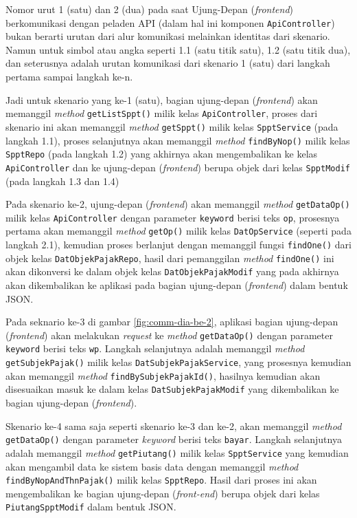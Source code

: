 \documentclass[pdftex,12pt, oneside]{article}
\begin{document}
Nomor urut 1 (satu) dan 2 (dua) pada saat Ujung-Depan (\textit{frontend}) berkomunikasi dengan peladen API (dalam hal ini komponen \texttt{ApiController}) bukan berarti urutan dari alur komunikasi melainkan identitas dari skenario. Namun untuk simbol atau angka seperti 1.1 (satu titik satu), 1.2 (satu titik dua), dan seterusnya adalah urutan komunikasi dari skenario 1 (satu) dari langkah pertama sampai langkah ke-n.

Jadi untuk skenario yang ke-1 (satu), bagian ujung-depan (\textit{frontend}) akan memanggil \textit{method} \texttt{getListSppt()} milik kelas \texttt{ApiController}, proses dari skenario ini akan memanggil \textit{method} \texttt{getSppt()} milik kelas \texttt{SpptService} (pada langkah 1.1), proses selanjutnya akan memanggil \textit{method} \texttt{findByNop()} milik kelas \texttt{SpptRepo} (pada langkah 1.2) yang akhirnya akan mengembalikan ke kelas \texttt{ApiController} dan ke ujung-depan (\textit{frontend}) berupa objek dari kelas \texttt{SpptModif} (pada langkah 1.3 dan 1.4)

Pada skenario ke-2, ujung-depan (\textit{frontend}) akan memanggil \textit{method} \texttt{getDataOp()} milik kelas \texttt{ApiController} dengan parameter \texttt{keyword} berisi teks \texttt{op}, prosesnya pertama akan memanggil \textit{method} \texttt{getOp()} milik kelas \texttt{DatOpService} (seperti pada langkah 2.1), kemudian proses berlanjut dengan memanggil fungsi \texttt{findOne()} dari objek kelas \texttt{DatObjekPajakRepo}, hasil dari pemanggilan \textit{method} \texttt{findOne()} ini akan dikonversi ke dalam objek kelas \texttt{DatObjekPajakModif} yang pada akhirnya akan dikembalikan ke aplikasi pada bagian ujung-depan (\textit{frontend}) dalam bentuk JSON.

Pada seknario ke-3 di gambar \ref{fig:comm-dia-be-2}, aplikasi bagian ujung-depan (\textit{frontend}) akan melakukan \textit{request} ke \textit{method} \texttt{getDataOp()} dengan parameter \texttt{keyword} berisi teks \texttt{wp}. Langkah selanjutnya adalah memanggil \textit{method} \texttt{getSubjekPajak()} milik kelas \texttt{DatSubjekPajakService}, yang prosesnya kemudian akan memanggil \textit{method} \texttt{findBySubjekPajakId()}, hasilnya kemudian akan disesuaikan masuk ke dalam kelas \texttt{DatSubjekPajakModif} yang dikembalikan ke bagian ujung-depan (\textit{frontend}).

Skenario ke-4 sama saja seperti skenario ke-3 dan ke-2, akan memanggil \textit{method} \texttt{getDataOp()} dengan parameter \textit{keyword} berisi teks \texttt{bayar}. Langkah selanjutnya adalah memanggil \textit{method} \texttt{getPiutang()} milik kelas \texttt{SpptService} yang kemudian akan mengambil data ke sistem basis data dengan memanggil \textit{method} \texttt{findByNopAndThnPajak()} milik kelas \texttt{SpptRepo}. Hasil dari proses ini akan mengembalikan ke bagian ujung-depan (\textit{front-end}) berupa objek dari kelas \texttt{PiutangSpptModif} dalam bentuk JSON.
\end{document}
